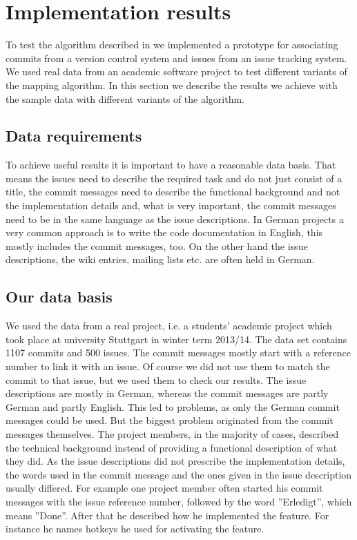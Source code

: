 \section{Implementation results}
\label{sec:implementation_results}
To test the algorithm described in  we implemented a prototype for associating commits from a version control system and issues from an issue tracking system.
We used real data from an academic software project to test different variants of the mapping algorithm.
In this section we describe the results we achieve with the sample data with different variants of the algorithm.

\subsection{Data requirements}
To achieve useful results it is important to have a reasonable data basis.
That means the issues need to describe the required task and do not just consist of a title, the commit messages need to describe the functional background and not the implementation details and, what is very important, the commit messages need to be in the same language as the issue descriptions.
In German projects a very common approach is to write the code documentation in English, this mostly includes the commit messages, too.
On the other hand the issue descriptions, the wiki entries, mailing lists etc. are often held in German.

\subsection{Our data basis}
We used the data from a real project, i.e. a students' academic project which took place at university Stuttgart in winter term 2013/14.
The data set contains 1107 commits and 500 issues.
The commit messages mostly start with a reference number to link it with an issue.
Of course we did not use them to match the commit to that issue, but we used them to check our results.
The issue descriptions are mostly in German, whereas the commit messages are partly German and partly English.
This led to problems, as only the German commit messages could be used.
But the biggest problem originated from the commit messages themselves.
The project members, in the majority of cases, described the technical background instead of providing a functional description of what they did.
As the issue descriptions did not prescribe the implementation details, the words used in the commit message and the ones given in the issue description usually differed.
For example one project member often started his commit messages with the issue reference number, followed by the word ''Erledigt'', which means ''Done''.
After that he described how he implemented the feature.
For instance he names hotkeys he used for activating the feature.\\

